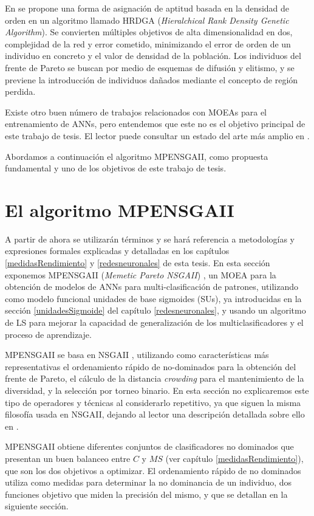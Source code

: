 En \cite{Yen2006} se propone una forma de asignación de aptitud basada en la densidad de
orden en un algoritmo llamado HRDGA (\textit{Hieralchical Rank Density Genetic
Algorithm}). Se convierten múltiples objetivos de alta dimensionalidad en dos, complejidad
de la red y error cometido, minimizando el error de orden de un individuo en concreto y el
valor de densidad de la población. Los individuos del frente de Pareto se buscan por medio
de esquemas de difusión y elitismo, y se previene la introducción de individuos dañados
mediante el concepto de región perdida.

Existe otro buen número de trabajos relacionados con MOEAs para el entrenamiento de ANNs,
pero entendemos que este no es el objetivo principal de este trabajo de tesis. El lector
puede consultar un estado del arte más amplio en \cite{Ou2007,Goh2008,Jin2008}.

Abordamos a continuación el algoritmo MPENSGAII, como propuesta fundamental y uno de los
objetivos de este trabajo de tesis.

\section{El algoritmo MPENSGAII}\label{algoritmo}
\noindent A partir de ahora se utilizarán términos y se hará referencia a
metodologías y expresiones formales explicadas y detalladas en los capítulos
\ref{medidasRendimiento} y \ref{redesneuronales}
de esta tesis. En esta sección exponemos  MPENSGAII (\textit{Memetic Pareto
NSGAII}) \cite{Fernandez2010}, un MOEA para la obtención de modelos de ANNs para
multi-clasificación de patrones, utilizando como modelo funcional unidades de base
sigmoides (SUs), ya introducidas en la sección \ref{unidadesSigmoide} del
capítulo \ref{redesneuronales}, y usando un algoritmo de LS para mejorar la capacidad de
generalización de los multiclasificadores y el proceso de aprendizaje.

MPENSGAII se basa en NSGAII \cite{Deb2002}, utilizando como características más
representativas el ordenamiento rápido de no-dominados para la obtención
del frente de Pareto, el cálculo de la distancia \textit{crowding} para el mantenimiento
de la diversidad, y la selección por torneo binario. En esta sección no explicaremos este
tipo de operadores y técnicas al considerarlo repetitivo, ya que siguen la misma filosofía
usada en NSGAII, dejando al lector una descripción detallada sobre ello en \cite{Deb2002}.

MPENSGAII obtiene diferentes conjuntos de clasificadores
no dominados que presentan un buen balanceo entre $C$ y $MS$ (ver capítulo
\ref{medidasRendimiento}), que son los dos objetivos a optimizar. El
ordenamiento rápido de no dominados utiliza como medidas para determinar la no dominancia
de un individuo, dos funciones objetivo que miden la precisión del mismo, y que se
detallan en la siguiente sección.

